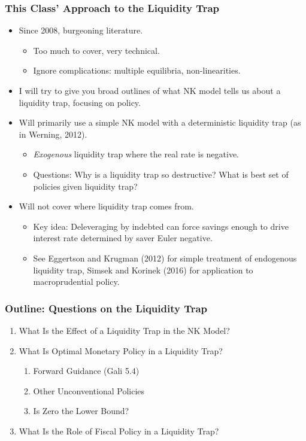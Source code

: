 \documentclass[english,xcolor=svgnames]{beamer}
\begin{document}
\begin{frame}
\frametitle{This Class' Approach to the Liquidity Trap}
\begin{itemize}
	\item Since 2008, burgeoning literature.
	\begin{itemize}
		\item Too much to cover, very technical.
		\item Ignore complications: multiple equilibria, non-linearities.
	\end{itemize}
	\item I will try to give you broad outlines of what NK model tells us about a liquidity trap, focusing on policy.
	\item Will primarily use a simple NK model with a deterministic liquidity trap (as in Werning, 2012).
	\begin{itemize}
		\item \emph{Exogenous} liquidity trap where the real rate is negative.
		\item Questions: Why is a liquidity trap so destructive? What is best set of policies given liquidity trap?
	\end{itemize}
	\item Will not cover where liquidity trap comes from.
	\begin{itemize}
		\item Key idea: Deleveraging by indebted can force savings enough to drive interest rate determined by saver Euler negative.
		\item See Eggertson and Krugman (2012) for simple treatment of endogenous liquidity trap, Simsek and Korinek (2016) for
application to macroprudential policy.
	\end{itemize}
\end{itemize}
\end{frame}

\begin{frame}
\frametitle{Outline: Questions on the Liquidity Trap}
\begin{enumerate}[1.]
	\item What Is the Effect of a Liquidity Trap in the NK Model?
	\item What Is Optimal Monetary Policy in a Liquidity Trap?
	\begin{enumerate}[2.1]
		\item Forward Guidance (Gali 5.4)
		\item Other Unconventional Policies
		\item Is Zero the Lower Bound?
	\end{enumerate}
	\item What Is the Role of Fiscal Policy in a Liquidity Trap?
\end{enumerate}
\end{frame}
\end{document}
